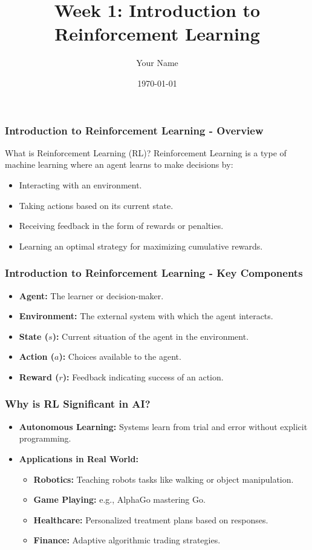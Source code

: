 \documentclass{beamer}
\title{Week 1: Introduction to Reinforcement Learning}
\author{Your Name}
\institute{Your Institution}
\date{\today}
\begin{document}
\frame{\titlepage}

\begin{frame}[fragile]
    \frametitle{Introduction to Reinforcement Learning - Overview}
    \begin{block}{What is Reinforcement Learning (RL)?}
        Reinforcement Learning is a type of machine learning where an agent learns to make decisions by:
        \begin{itemize}
            \item Interacting with an environment.
            \item Taking actions based on its current state.
            \item Receiving feedback in the form of rewards or penalties.
            \item Learning an optimal strategy for maximizing cumulative rewards.
        \end{itemize}
    \end{block}
\end{frame}

\begin{frame}[fragile]
    \frametitle{Introduction to Reinforcement Learning - Key Components}
    \begin{itemize}
        \item \textbf{Agent:} The learner or decision-maker.
        \item \textbf{Environment:} The external system with which the agent interacts.
        \item \textbf{State ($s$):} Current situation of the agent in the environment.
        \item \textbf{Action ($a$):} Choices available to the agent.
        \item \textbf{Reward ($r$):} Feedback indicating success of an action.
    \end{itemize}
\end{frame}

\begin{frame}[fragile]
    \frametitle{Why is RL Significant in AI?}
    \begin{itemize}
        \item \textbf{Autonomous Learning:} Systems learn from trial and error without explicit programming.
        \item \textbf{Applications in Real World:}
            \begin{itemize}
                \item \textbf{Robotics:} Teaching robots tasks like walking or object manipulation.
                \item \textbf{Game Playing:} e.g., AlphaGo mastering Go.
                \item \textbf{Healthcare:} Personalized treatment plans based on responses.
                \item \textbf{Finance:} Adaptive algorithmic trading strategies.
            \end{itemize}
    \end{itemize}
\end{frame}
\end{document}
